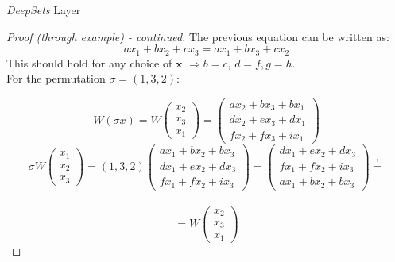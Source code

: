 \documentclass{beamer}
\begin{document}
\begin{frame}{\emph{DeepSets} Layer}
    \renewcommand{\qedsymbol}{} 
    \begin{proof}[Proof (through example) - continued]
        {\footnotesize
        The previous equation can be written as:
        \[ax_1 + bx_2 + cx_3 = ax_1 + bx_3 + cx_2\]
        This should hold for any choice of $\mathbf{x}$ $\Rightarrow b = c$, $d=f, g=h$. \\
        For the permutation $\sigma = (1,3,2)$:  
        
        \[W(\sigma x) = W \begin{pmatrix}
            x_2 \\
            x_3 \\
            x_1
        \end{pmatrix} = 
        \begin{pmatrix}
            ax_2 + bx_3 + bx_1 \\
            dx_2 + ex_3 + dx_1 \\
            fx_2 + fx_3 + ix_1
        \end{pmatrix}\]
        \[
        \sigma W \begin{pmatrix}
            x_1 \\
            x_2 \\
            x_3
        \end{pmatrix} = (1,3, 2) \begin{pmatrix}
            ax_1 + bx_2 + bx_3 \\
            dx_1 + ex_2 + dx_3 \\
            fx_1 + fx_2 + ix_3
        \end{pmatrix} = \begin{pmatrix}
            dx_1 + ex_2 + dx_3 \\
            fx_1 + fx_2 + ix_3 \\
            ax_1 + bx_2 + bx_3
        \end{pmatrix} \stackrel{!}{=} \] \\
        \[ = W \begin{pmatrix}
            x_2 \\
            x_3 \\
            x_1
        \end{pmatrix}
        \]
        }
    \end{proof}
    \renewcommand{\qedsymbol}{\ensuremath{\square}} 
\end{frame}
\end{document}
